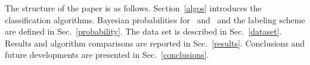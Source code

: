 The structure of the paper is as follows. Section~\ref{algos} introduces the classification algorithms. Bayesian probabilities for \hasns\ and \hasrem\ and the labeling scheme are defined
in Sec.~\ref{probability}. The data set is described in Sec.~\ref{dataset}. Results and algorithm comparisons are reported in Sec.~\ref{results}. Conclusions and future developments are
presented in Sec.~\ref{conclusions}.  
